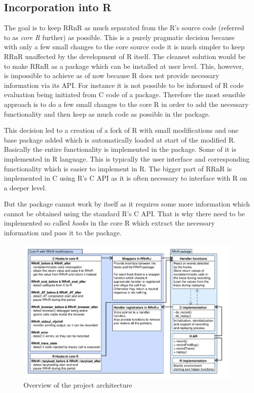 \documentclass[thesis=M,english,hidelinks]{FITthesis}[2012/10/20]
\begin{document}
		\subsection{Incorporation into R}
		The goal is to keep RRnR as much separated from the R's source code (referred to as \emph{core R} further) as possible. This is a purely pragmatic decision because with only a few small changes to the core source code it is much simpler to keep RRnR unaffected by the development of R itself. The cleanest solution would be to make RRnR as a package which can be installed at user level. This, however, is impossible to achieve as of now because R does not provide necessary information via its API. For instance it is not possible to be informed of R code evaluation being initiated from C code of a package. Therefore the most sensible approach is to do a few small changes to the core R in order to add the necessary functionality and then keep as much code as possible in the package.\par
		
		This decision led to a creation of a fork of R with small modifications and one base package added which is automatically loaded at start of the modified R. Basically the entire functionality is implemented in the package. Some of it is implemented in R language. This is typically the user interface and corresponding functionality which is easier to implement in R. The bigger part of RRnR is implemented in C using R's C API as it is often necessary to interface with R on a deeper level.\par
		
		But the package cannot work by itself as it requires some more information which cannot be obtained using the standard R's C API. That is why there need to be implemented so called \emph{hooks} in the core R which extract the necessary information and pass it to the package.\par
		
		\begin{figure}[ht]\centering
			\includegraphics[width=1.0\textwidth]{img/incorporation_into_r2}
			\caption{Overview of the project architecture}\label{fig:incorporation_into_r2}
		\end{figure}
		
\end{document}
